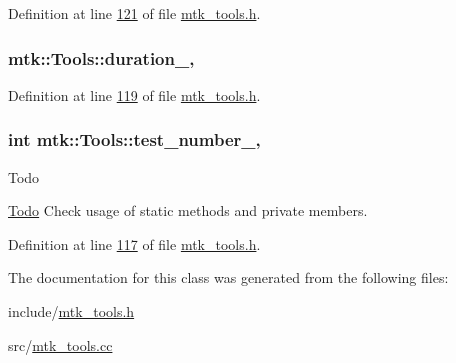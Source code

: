 Definition at line \hyperlink{mtk__tools_8h_source_l00121}{121} of file \hyperlink{mtk__tools_8h_source}{mtk\+\_\+tools.\+h}.

\hypertarget{classmtk_1_1Tools_aba9d3d2952a3de9e7b46faa86d28d692}{
\subsubsection[{duration\+\_\+}]{ mtk\+::\+Tools\+::duration\+\_\+\hspace{0.3cm}{\ttfamily [static]}, {\ttfamily [private]}}}\label{classmtk_1_1Tools_aba9d3d2952a3de9e7b46faa86d28d692}


Definition at line \hyperlink{mtk__tools_8h_source_l00119}{119} of file \hyperlink{mtk__tools_8h_source}{mtk\+\_\+tools.\+h}.

\hypertarget{classmtk_1_1Tools_a04a60458594336ee1badff79b8a9a77f}{
\subsubsection[{test\+\_\+number\+\_\+}]{\setlength{\rightskip}{0pt plus 5cm}int mtk\+::\+Tools\+::test\+\_\+number\+\_\+\hspace{0.3cm}{\ttfamily [static]}, {\ttfamily [private]}}}\label{classmtk_1_1Tools_a04a60458594336ee1badff79b8a9a77f}
\begin{DoxyRefDesc}{Todo}
\item[\hyperlink{todo__todo000024}{Todo}]Check usage of static methods and private members. \end{DoxyRefDesc}


Definition at line \hyperlink{mtk__tools_8h_source_l00117}{117} of file \hyperlink{mtk__tools_8h_source}{mtk\+\_\+tools.\+h}.



The documentation for this class was generated from the following files\+:\begin{DoxyCompactItemize}
\item 
include/\hyperlink{mtk__tools_8h}{mtk\+\_\+tools.\+h}\item 
src/\hyperlink{mtk__tools_8cc}{mtk\+\_\+tools.\+cc}\end{DoxyCompactItemize}

